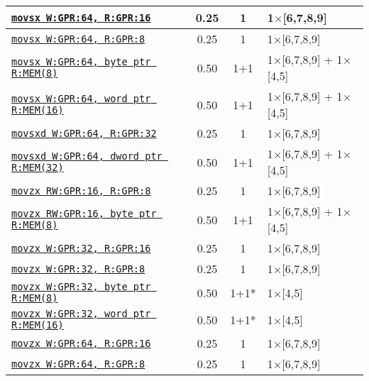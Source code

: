 \documentclass[a4paper,english,fontsize=9]{scrartcl}
\begin{document}
\begin{longtable}{p{}ccL{.25\textwidth}}
  \midrule
  \texttt{\href{https://felixcloutier.com/x86/MOVSX:MOVSXD.html}{movsx W:GPR:64, R:GPR:16}} & 0.25 & 1 & 1\(\times\)[6,7,8,9] \\
  \midrule
  \texttt{\href{https://felixcloutier.com/x86/MOVSX:MOVSXD.html}{movsx W:GPR:64, R:GPR:8}} & 0.25 & 1 & 1\(\times\)[6,7,8,9] \\
  \midrule
  \texttt{\href{https://felixcloutier.com/x86/MOVSX:MOVSXD.html}{movsx W:GPR:64, byte ptr R:MEM(8)}} & 0.50 & 1+1 & 1\(\times\)[6,7,8,9] + 1\(\times\)[4,5] \\
  \midrule
  \texttt{\href{https://felixcloutier.com/x86/MOVSX:MOVSXD.html}{movsx W:GPR:64, word ptr R:MEM(16)}} & 0.50 & 1+1 & 1\(\times\)[6,7,8,9] + 1\(\times\)[4,5] \\
  \midrule
  \texttt{\href{https://felixcloutier.com/x86/MOVSX:MOVSXD.html}{movsxd W:GPR:64, R:GPR:32}} & 0.25 & 1 & 1\(\times\)[6,7,8,9] \\
  \midrule
  \texttt{\href{https://felixcloutier.com/x86/MOVSX:MOVSXD.html}{movsxd W:GPR:64, dword ptr R:MEM(32)}} & 0.50 & 1+1 & 1\(\times\)[6,7,8,9] + 1\(\times\)[4,5] \\
  \midrule
  \texttt{\href{https://felixcloutier.com/x86/MOVZX.html}{movzx RW:GPR:16, R:GPR:8}} & 0.25 & 1 & 1\(\times\)[6,7,8,9] \\
  \midrule
  \texttt{\href{https://felixcloutier.com/x86/MOVZX.html}{movzx RW:GPR:16, byte ptr R:MEM(8)}} & 0.50 & 1+1 & 1\(\times\)[6,7,8,9] + 1\(\times\)[4,5] \\
  \midrule
  \texttt{\href{https://felixcloutier.com/x86/MOVZX.html}{movzx W:GPR:32, R:GPR:16}} & 0.25 & 1 & 1\(\times\)[6,7,8,9] \\
  \midrule
  \texttt{\href{https://felixcloutier.com/x86/MOVZX.html}{movzx W:GPR:32, R:GPR:8}} & 0.25 & 1 & 1\(\times\)[6,7,8,9] \\
  \midrule
  \texttt{\href{https://felixcloutier.com/x86/MOVZX.html}{movzx W:GPR:32, byte ptr R:MEM(8)}} & 0.50 & 1+1* & 1\(\times\)[4,5] \\
  \midrule
  \texttt{\href{https://felixcloutier.com/x86/MOVZX.html}{movzx W:GPR:32, word ptr R:MEM(16)}} & 0.50 & 1+1* & 1\(\times\)[4,5] \\
  \midrule
  \texttt{\href{https://felixcloutier.com/x86/MOVZX.html}{movzx W:GPR:64, R:GPR:16}} & 0.25 & 1 & 1\(\times\)[6,7,8,9] \\
  \midrule
  \texttt{\href{https://felixcloutier.com/x86/MOVZX.html}{movzx W:GPR:64, R:GPR:8}} & 0.25 & 1 & 1\(\times\)[6,7,8,9] \\

\end{longtable}
\end{document}
